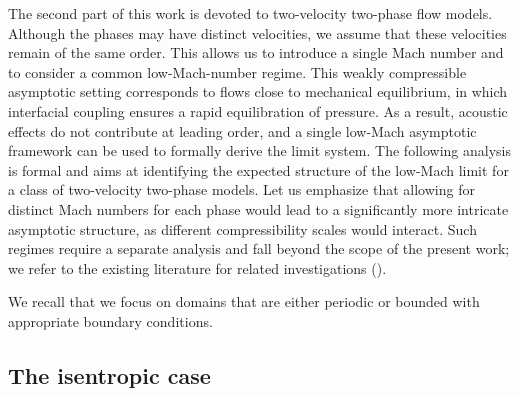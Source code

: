 \documentclass[11pt, twoside, a4paper]{article}
\theoremstyle{plain}
\theoremstyle{remark}
\numberwithin{equation}{section}
\begin{document}
The second part of this work is devoted to two-velocity two-phase flow models. Although the phases may have distinct velocities, we assume that these velocities remain of the same order. This allows us to introduce a single Mach number and to consider a common low-Mach-number regime. This weakly compressible asymptotic setting corresponds to flows close to mechanical equilibrium, in which interfacial coupling ensures a rapid equilibration of pressure. As a result, acoustic effects do not contribute at leading order, and a single low-Mach asymptotic framework can be used to formally derive the limit system. The following analysis is formal and aims at identifying the expected structure of the low-Mach limit for a class of two-velocity two-phase models. Let us emphasize that allowing for distinct Mach numbers for each phase would lead to a significantly more intricate asymptotic structure, as different compressibility scales would interact. Such regimes require a separate analysis and fall beyond the scope of the present work; we refer to the existing literature for related investigations (\cite{benjelloun2021sound}).

We recall that we focus on domains that are either periodic or bounded with appropriate boundary conditions.

\subsection{The isentropic case}
\end{document}
